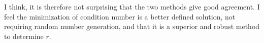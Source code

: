 I think, it is therefore not surprising that the two methods give good
agreement. I feel the minimization of condition number is a better
defined solution, not requiring random number generation, and that it
is a superior and robust method to determine $r$.

















